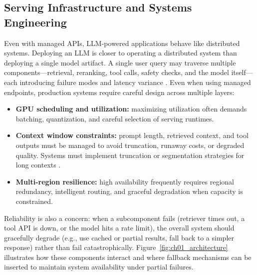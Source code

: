 \subsection{Serving Infrastructure and Systems Engineering}
Even with managed APIs, LLM-powered applications behave like distributed systems. Deploying an LLM is closer to operating a distributed system than deploying a single model artifact. A single user query may traverse multiple components—retrieval, reranking, tool calls, safety checks, and the model itself—each introducing failure modes and latency variance \cite{edge2025llmops}. Even when using managed endpoints, production systems require careful design across multiple layers:

\begin{itemize}
  \item \textbf{GPU scheduling and utilization:} maximizing utilization often demands batching, quantization, and careful selection of serving runtimes.
  \item \textbf{Context window constraints:} prompt length, retrieved context, and tool outputs must be managed to avoid truncation, runaway costs, or degraded quality. Systems must implement truncation or segmentation strategies for long contexts \cite{liu2023promptSurvey}.
  \item \textbf{Multi-region resilience:} high availability frequently requires regional redundancy, intelligent routing, and graceful degradation when capacity is constrained.
\end{itemize}

Reliability is also a concern: when a subcomponent fails (retriever times out, a tool API is down, or the model hits a rate limit), the overall system should gracefully degrade (e.g., use cached or partial results, fall back to a simpler response) rather than fail catastrophically. Figure~\ref{fig:ch01_architecture} illustrates how these components interact and where fallback mechanisms can be inserted to maintain system availability under partial failures.

